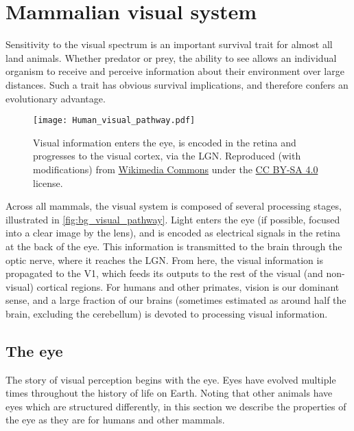 \section{Mammalian visual system}
\label{sec:bg_visual_system}

Sensitivity to the visual spectrum is an important survival trait for almost all land animals.
Whether predator or prey, the ability to see allows an individual organism to receive and perceive information about their environment over large distances.
Such a trait has obvious survival implications, and therefore confers an evolutionary advantage.

\begin{figure}[htbp]
\centering
\texttt{[image: Human\_visual\_pathway.pdf]}
\caption{%
Visual information enters the eye, is encoded in the retina and progresses to the visual cortex, via the \ac{LGN}.
Reproduced (with modifications) from \href{https://commons.wikimedia.org/wiki/File:Human_visual_pathway.svg}{Wikimedia Commons} under the \href{https://creativecommons.org/licenses/by-sa/4.0/deed.en}{CC BY-SA 4.0} license.
}
\label{fig:bg_visual_pathway}
\end{figure}

Across all mammals, the visual system is composed of several processing stages, illustrated in \autoref{fig:bg_visual_pathway}.
Light enters the eye (if possible, focused into a clear image by the lens), and is encoded as electrical signals in the retina at the back of the eye.
This information is transmitted to the brain through the optic nerve, where it reaches the \ac{LGN}.
From here, the visual information is propagated to the \acf{V1}, which feeds its outputs to the rest of the visual (and non-visual) cortical regions.
For humans and other primates, vision is our dominant sense, and a large fraction of our brains (sometimes estimated as around half the brain, excluding the cerebellum) is devoted to processing visual information.


\subsection{The eye}

The story of visual perception begins with the eye.
Eyes have evolved multiple times throughout the history of life on Earth.
Noting that other animals have eyes which are structured differently, in this section we describe the properties of the eye as they are for humans and other mammals.



